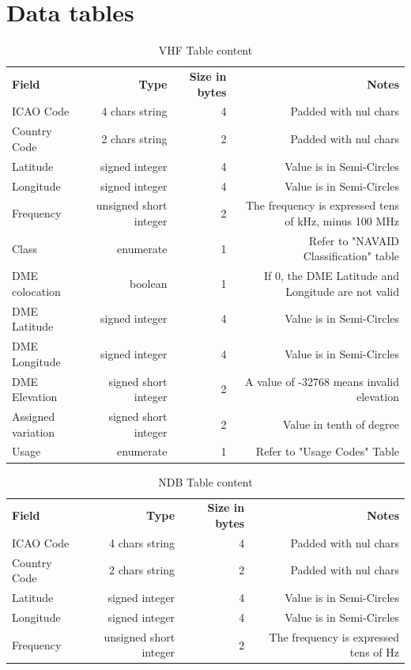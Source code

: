 \documentclass{article}
\newcommand\strpad{Padded with nul chars}
\newcommand\SemiCircle{Value is in Semi-Circles}
\begin{document}
\section{Data tables}
\begin{table}[H]
   \caption{VHF Table content} 
   \label{tab:VHF}
   \small
   \begin{tabular}{|l|r|r|r|}
   \textbf{Field} & \textbf{Type} & \textbf{Size in bytes} & \textbf{Notes} \\ 
   ICAO Code & 4 chars string & 4 & \strpad \\
   Country Code & 2 chars string & 2 &\strpad \\
   Latitude & signed integer & 4 & \SemiCircle\\
   Longitude & signed integer & 4& \SemiCircle\\
   Frequency & unsigned short integer & 2 & The frequency is expressed tens of kHz, minus 100 MHz \\
   Class & enumerate & 1 & Refer to "NAVAID Classification" table\\
   DME colocation & boolean & 1 & If 0, the DME Latitude and Longitude are not valid\\ 
   DME Latitude  & signed integer & 4 & \SemiCircle\\
   DME Longitude & signed integer & 4 & \SemiCircle\\
   DME Elevation & signed short integer & 2 & A value of -32768 means invalid elevation\\
   Assigned variation & signed short integer & 2 & Value in tenth of degree\\
   Usage & enumerate & 1 & Refer to "Usage Codes" Table
   \end{tabular}
\end{table}
\begin{table}[H]
   \caption{NDB Table content} 
   \label{tab:NDB}
   \small
   \begin{tabular}{|l|r|r|r|}
   \textbf{Field} & \textbf{Type} & \textbf{Size in bytes} & \textbf{Notes} \\ 
   ICAO Code & 4 chars string & 4 & \strpad \\
   Country Code & 2 chars string & 2 &\strpad \\
   Latitude & signed integer & 4 & \SemiCircle\\
   Longitude & signed integer & 4& \SemiCircle\\
   Frequency & unsigned short integer & 2 & The frequency is expressed tens of Hz \\
   \end{tabular}
\end{table}
\end{document}
